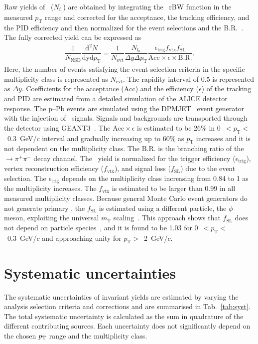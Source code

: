 Raw yields of \fzero~($N_{\mathrm{f}_{0}}$) are obtained by integrating the \fzero~rBW function in the measured $p_{\mathrm{T}}$ range and corrected for the acceptance, the tracking efficiency, and the PID efficiency and then normalized for the event selections and the B.R.~\cite{Stone:2013eaa}. The fully corrected yield can be expressed as
\begin{eqnarray}
\dfrac{1}{N_{\mathrm{NSD}}}\dfrac{\mathrm{d}^{2}N}{\mathrm{dyd}p_{\mathrm{T}}} = \dfrac{1}{N_{\mathrm{evt}}} \dfrac{ N_{\mathrm{f}_{0}} }{ \Delta y \Delta p_{\mathrm{T}} } \dfrac{  \epsilon_{\mathrm{trig}} f_{\mathrm{vtx}} f_{\mathrm{SL}} }{\mathrm{Acc} \times \epsilon \times \mathrm{B.R.} }.
\end{eqnarray}
Here, the number of events satisfying the event selection criteria in the specific multiplicity class is represented as $N_{\mathrm{evt}}$. The rapidity interval of 0.5 is represented as $\Delta y$. Coefficients for the acceptance ($\mathrm{Acc}$) and the efficiency ($\epsilon$) of the tracking and PID are estimated from a detailed simulation of the ALICE detector response. The p--Pb events are simulated using the DPMJET~\cite{Fedynitch:2015kcn} event generator with the injection of \fzero~signals. Signals and backgrounds are transported through the detector using GEANT3~\cite{Brun:1994aa}. The $\mathrm{Acc}\times\epsilon$ is estimated to be 26\% in 0~$<p_{\mathrm{T}}<$~0.3~GeV/$c$ interval and gradually increasing up to 60\% as $p_{\mathrm{T}}$ increases and it is not dependent on the multiplicity class. The $\mathrm{B.R.}$ is the branching ratio of the \fzero~$\rightarrow \pi^{+}\pi^{-}$ decay channel. The \fzero~yield is normalized for the trigger efficiency ($\epsilon_{\mathrm{trig}}$), vertex reconstruction efficiency ($f_{\mathrm{vtx}}$), and signal loss ($f_{\mathrm{SL}}$) due to the event selection. The $\epsilon_{\mathrm{trig}}$ depends on the multiplicity class increasing from 0.84 to 1 as the multiplicity increases. The $f_{\mathrm{vtx}}$ is estimated to be larger than 0.99 in all measured multiplicity classes. Because general Monte Carlo event generators do not generate primary \fzero, the $f_{\mathrm{SL}}$ is estimated using a different particle, the $\phi$ meson, exploiting the universal $m_{\mathrm{T}}$ scaling~\cite{Altenkamper:2017qot}. This approach shows that $f_{\mathrm{SL}}$ does not depend on particle species~\cite{ALICE:2019xyr}, and it is found to be 1.03 for 0~$<p_{\mathrm{T}}<$~0.3~GeV/$c$ and approaching unity for $p_{\mathrm{T}}>$~2~GeV/$c$.

\section{Systematic uncertainties}
\label{sec:syst}
The systematic uncertainties of invariant yields are estimated by varying the analysis selection criteria and corrections and are summarised in Tab.~\ref{tab:syst}. The total systematic uncertainty is calculated as the sum in quadrature of the different contributing sources. Each uncertainty does not significantly depend on the chosen $p_{\rm{T}}$ range and the multiplicity class.

